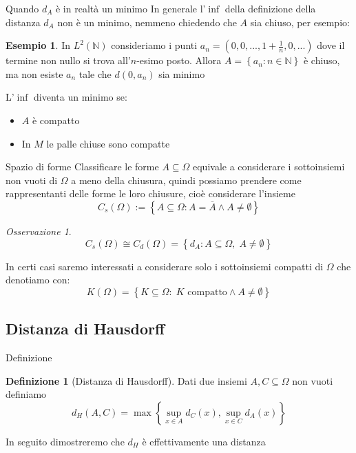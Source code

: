 \documentclass{beamer}
\newcounter{counter1}
\theoremstyle{plain}
\theoremstyle{definition}
\newtheorem{mydef}[counter1]{Definizione}
\newtheorem{myes}[counter1]{Esempio}
\theoremstyle{remark}
\newtheorem{myoss}[counter1]{Osservazione}
\newcommand{\obar}[1]{\overline{#1}}
\newcommand{\set}[1]{\left\{#1\right\}}
\begin{document}
\begin{frame}{Quando $d_A$ \`e in realt\`a un minimo}
  In generale l'$\inf$ della definizione della distanza $d_A$ non \`e
  un minimo, nemmeno chiedendo che $A$ sia chiuso, per esempio:
  \begin{myes}
    In $L^2(\mathbb{N})$ consideriamo i punti $a_n = ( 0, 0, ..., 1 +
    \frac{1}{n} , 0, ...)$ dove il termine non nullo si trova
    all'$n$-esimo posto. Allora $A = \set{ a_n : n\in \mathbb{N}}$ \`e
    chiuso, ma non esiste $a_n$ tale che $d(0,a_n)$ sia minimo
  \end{myes}

  L'$\inf$ diventa un minimo se:
  \begin{itemize}
  \item $A$ \`e compatto
  \item In $M$ le palle chiuse sono compatte
  \end{itemize}
\end{frame}

\begin{frame}{Spazio di forme}
  Classificare le forme $A \subseteq \Omega$ equivale a considerare i
  sottoinsiemi non vuoti di $\Omega$ a meno della chiusura, quindi
  possiamo prendere come rappresentanti delle forme le loro chiusure,
  cioè considerare l'insieme
  \[ C_s(\Omega) := \set{ A \subseteq \Omega : A = \obar A \wedge A
    \neq \emptyset } \]

  \begin{myoss}
    \[ C_s(\Omega) \cong C_d(\Omega) = \set{d_A : A \subseteq \Omega,\;
      A \neq \emptyset} \]
  \end{myoss}
  \vfill
  In certi casi saremo interessati a considerare solo i sottoinsiemi
  compatti di $\Omega$ che denotiamo con:
  \[ K(\Omega) = \set{K\subseteq \Omega :\; K \text{ compatto} \wedge
    A \neq \emptyset} \]
\end{frame}

\subsection{Distanza di Hausdorff}

\begin{frame}{Definizione}
  \begin{mydef}[Distanza di Hausdorff]
    Dati due insiemi $A,C \subseteq \Omega$ non vuoti definiamo
    \[ d_H(A,C) = \max \set{\sup _{x\in A} d_C (x) , \sup _{x\in C}
      d_A (x) } \]
\end{mydef}

In seguito dimostreremo che $d_H$ è effettivamente una distanza
\end{frame}
\end{document}
